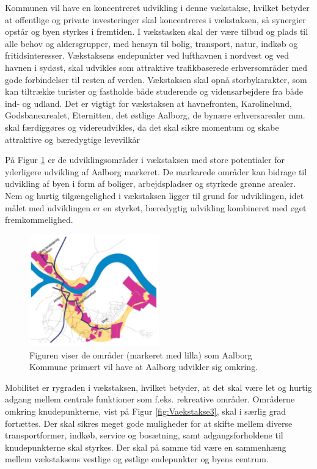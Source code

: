 Kommunen vil have en koncentreret udvikling i denne vækstakse, hvilket betyder at offentlige og private investeringer skal koncentreres i vækstaksen, så synergier opstår og byen styrkes i fremtiden. I vækstasken skal der være tilbud og plads til alle behov og aldersgrupper, med hensyn til bolig, transport, natur, indkøb og fritidsinteresser. Vækstaksens endepunkter ved lufthavnen i nordvest og ved havnen i sydøst, skal udvikles som attraktive trafikbaserede erhversområder med gode forbindelser til resten af verden. Vækstaksen skal opnå storbykarakter, som kan tiltrække turister og fastholde både studerende og vidensarbejdere fra både ind- og udland. Det er vigtigt for vækstaksen at havnefronten, Karolinelund, Godsbanearealet, Eternitten, det østlige Aalborg, de bynære erhversarealer mm. skal færdiggøres og videreudvikles, da det skal sikre momentum og skabe attraktive og bæredygtige levevilkår

På Figur \ref{fig:Vaekstakse2}  er de udviklingsområder i vækstaksen med store potentialer for yderligere udvikling af Aalborg markeret. De markarede områder kan bidrage til udvikling af byen i form af boliger, arbejdspladser og styrkede grønne arealer. Nem og hurtig tilgængelighed i vækstaksen ligger til grund for udviklingen, idet målet med udviklingen er en styrket, bæredygtig udvikling kombineret med øget fremkommelighed.

\begin{figure}[H]
\centering
\includegraphics[width=0.50\textwidth]{billeder/Vaekstakse2}
\caption{Figuren viser de områder (markeret med lilla) som Aalborg Kommune primært vil have at Aalborg udvikler sig omkring.}
\label{fig:Vaekstakse2}
\end{figure}

Mobilitet er rygraden i vækstaksen, hvilket betyder, at det skal være let og hurtig adgang mellem centrale funktioner som f.eks. rekreative områder. Områderne omkring  knudepunkterne, vist på Figur \ref{fig:Vaekstakse3}, skal i særlig grad fortættes. Der skal sikres meget gode muligheder for at skifte mellem diverse transportformer, indkøb, service og bosætning, samt adgangsforholdene til knudepunkterne skal styrkes. Der skal på samme tid være en sammenhæng mellem vækstaksens vestlige og østlige endepunkter og byens centrum. 

